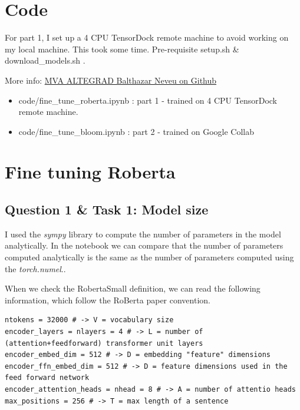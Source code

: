 \documentclass[a4paper]{article}
\begin{document}

\section*{Code}
For part 1, I set up a 4 CPU TensorDock remote machine to avoid working on my local machine.
This took some time. Pre-requisite setup.sh \& download\_models.sh .

More info:
\href{https://github.com/balthazarneveu/MVA23_ALTEGRAD/#readme}{MVA ALTEGRAD Balthazar Neveu on Github}

\begin{itemize}
    \item code/fine\_tune\_roberta.ipynb : part 1 - trained on 4 CPU TensorDock remote machine.
    \item code/fine\_tune\_bloom.ipynb : part 2 - trained on Google Collab
\end{itemize}

\section{Fine tuning Roberta\cite{liu2019roberta}}
\subsection*{Question 1 \& Task 1: Model size}
I used the \textit{sympy} library to compute the number of parameters in the model analytically.
In the notebook we can compare that the number of parameters computed analytically is the same as the number of parameters computed using the \textit{torch.numel}..


When we check the RobertaSmall definition, we can read the following information, which follow the RoBerta\cite{liu2019roberta} paper convention.
\begin{verbatim}
ntokens = 32000 # -> V = vocabulary size
encoder_layers = nlayers = 4 # -> L = number of (attention+feedforward) transformer unit layers
encoder_embed_dim = 512 # -> D = embedding "feature" dimensions
encoder_ffn_embed_dim = 512 # -> D = feature dimensions used in the feed forward network
encoder_attention_heads = nhead = 8 # -> A = number of attentio heads
max_positions = 256 # -> T = max length of a sentence
\end{verbatim}
\end{document}
